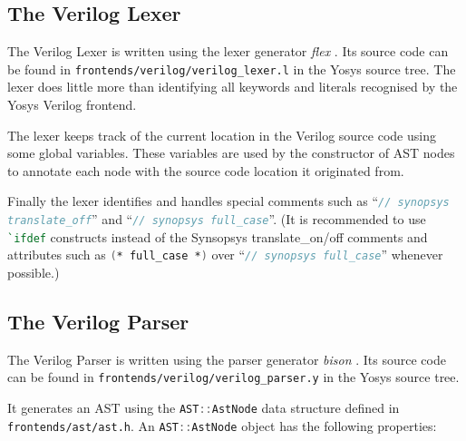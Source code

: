 \subsection{The Verilog Lexer}

\begin{sloppypar}
The Verilog Lexer is written using the lexer generator {\it flex} . Its source code
can be found in {\tt frontends/verilog/verilog\_lexer.l} in the Yosys source tree.
The lexer does little more than identifying all keywords and literals
recognised by the Yosys Verilog frontend.
\end{sloppypar}

The lexer keeps track of the current location in the Verilog source code using
some global variables. These variables are used by the constructor of AST nodes
to annotate each node with the source code location it originated from.

\begin{sloppypar}
Finally the lexer identifies and handles special comments such as
``\lstinline[language=Verilog]{// synopsys translate_off}'' and
``\lstinline[language=Verilog]{// synopsys full_case}''. (It is recommended to
use \lstinline[language=Verilog]{`ifdef} constructs instead of the Synsopsys
translate\_on/off comments and attributes such as
\lstinline[language=Verilog]{(* full_case *)} over ``\lstinline[language=Verilog]{// synopsys full_case}''
whenever possible.)
\end{sloppypar}

\subsection{The Verilog Parser}

The Verilog Parser is written using the parser generator {\it bison} . Its source code
can be found in {\tt frontends/verilog/verilog\_parser.y} in the Yosys source tree.

It generates an AST using the \lstinline[language=C++]{AST::AstNode} data structure
defined in {\tt frontends/ast/ast.h}. An \lstinline[language=C++]{AST::AstNode} object has
the following properties:


